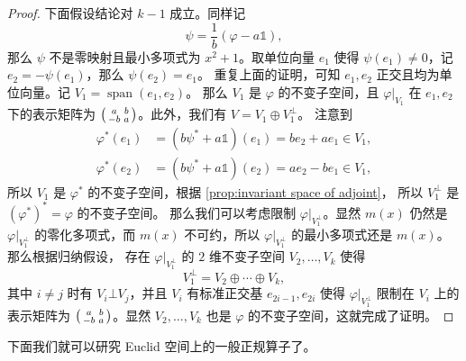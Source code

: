 \documentclass[fontset=none,zihao=-4]{Notes}
\newcommand{\spa}[1]{\operatorname{span}\left(#1\right)}
\begin{document}
\begin{proof}
  下面假设结论对 $k-1$ 成立。同样记
  \[
    \psi=\frac{1}{b}(\varphi-a\mathbb{1}),
  \]
  那么 $\psi$ 不是零映射且最小多项式为 $x^2+1$。取单位向量 $e_1$ 使得
  $\psi(e_1)\neq 0$，记 $e_2=-\psi(e_1)$，那么 $\psi(e_2)=e_1$。
  重复上面的证明，可知 $e_1,e_2$ 正交且均为单位向量。记 $V_1=\spa{e_1,e_2}$。
  那么 $V_1$ 是 $\varphi$ 的不变子空间，且 $\varphi|_{V_1}$ 在 $e_1,e_2$
  下的表示矩阵为  
  $\begin{psmallmatrix}
    a & b \\
    -b & a
  \end{psmallmatrix}$。此外，我们有 $V=V_1\oplus V_1^\bot$。
  注意到
  \begin{align*}
    \varphi^*(e_1)&=(b\psi^*+a\mathbb{1})(e_1)=be_2+ae_1\in V_1, \\
    \varphi^*(e_2)&=(b\psi^*+a\mathbb{1})(e_2)=ae_2-be_1\in V_1,
  \end{align*}
  所以 $V_1$ 是 $\varphi^*$ 的不变子空间，根据 \autoref{prop:invariant space of adjoint}，
  所以 $V_1^\bot$ 是 $(\varphi^*)^*=\varphi$ 的不变子空间。
  那么我们可以考虑限制 $\varphi|_{V_1^\bot}$。显然 $m(x)$ 仍然是
  $\varphi|_{V_1^\bot}$ 的零化多项式，而 $m(x)$ 不可约，所以
  $\varphi|_{V_1^\bot}$ 的最小多项式还是 $m(x)$。那么根据归纳假设，
  存在 $\varphi|_{V_1^\bot}$ 的 $2$ 维不变子空间 $V_2,\dots,V_k$
  使得
  \[
    V_1^\bot=V_2\oplus\cdots\oplus V_k,  
  \] 
  其中 $i\neq j$ 时有 $V_i\bot V_j$，并且 $V_i$ 有标准正交基 $e_{2i-1},e_{2i}$
  使得  $\varphi|_{V_1^\bot}$ 限制在 $V_i$ 上的表示矩阵为 
  $\begin{psmallmatrix}
    a & b \\
    -b & a
  \end{psmallmatrix}$。显然 $V_2,\dots,V_k$ 也是 $\varphi$ 的不变子空间，这就完成了证明。
\end{proof} 

下面我们就可以研究 Euclid 空间上的一般正规算子了。
\end{document}
